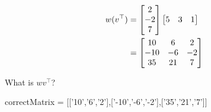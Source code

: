 \documentclass{ximera}
\begin{document}
\begin{question}
  \begin{solution}
    \begin{hint}
      \begin{align*}
        w(v^\top) &=  \begin{bmatrix}2\\-2\\7\end{bmatrix}\begin{bmatrix} 5 & 3 & 1\end{bmatrix}\\
        &=\begin{bmatrix}
          10  & 6 & 2\\
          -10 & -6& -2\\
          35  & 21& 7
        \end{bmatrix}
      \end{align*}
    \end{hint}
    What is $wv^\top$? 
    \begin{matrix-answer}
      correctMatrix = [['10','6','2'],['-10','-6','-2'],['35','21','7']]
    \end{matrix-answer}
  \end{solution}
\end{question}
\end{document}
